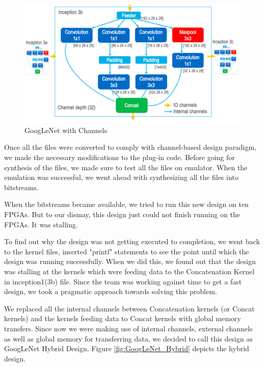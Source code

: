 \begin{figure}[!htb]
  \includegraphics[width=\textwidth,height=\textheight,keepaspectratio]{img/GoogLeNet_Channels.png}
  \caption{GoogLeNet with Channels}
  \label{fig:GoogLeNet_Channels}
\end{figure}


Once all the files were converted to comply with channel-based design paradigm, we made the necessary modifications to the plug-in code. Before going for synthesis of the files, we made sure to test all the files on emulator. When the emulation was successful, we went ahead with synthesizing all the files into bitstreams.

When the bitstreams became available, we tried to run this new design on ten FPGAs. But to our dismay, this design just could not finish running on the FPGAs. It was stalling.

To find out why the design was not getting executed to completion, we went back to the kernel files, inserted "printf" statements to see the point until which the design was running successfully. When we did this, we found out that the design was stalling at the kernels which were feeding data to the Concatenation Kernel in inception1(3b) file. Since the team was working against time to get a fast design, we took a pragmatic approach towards solving this problem.

We replaced all the internal channels between Concatenation kernels (or Concat kernels) and the kernels feeding data to Concat kernels with global memory transfers. Since now we were making use of internal channels, external channels as well as global memory for transferring data, we decided to call this design as GoogLeNet Hybrid Design. Figure \ref{fig:GoogLeNet_Hybrid} depicts the hybrid design. 

